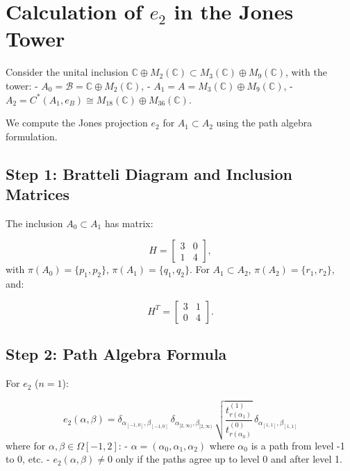 \documentclass[11pt]{article}
\theoremstyle{mytheoremstyle}
\theoremstyle{definition}
\theoremstyle{remark}
\begin{document}
\section*{Calculation of \( e_2 \) in the Jones Tower}

Consider the unital inclusion \( \mathbb{C} \oplus M_2(\mathbb{C}) \subset M_3(\mathbb{C}) \oplus M_9(\mathbb{C}) \), with the tower:
- \( A_0 = \mathcal{B} = \mathbb{C} \oplus M_2(\mathbb{C}) \),
- \( A_1 = A = M_3(\mathbb{C}) \oplus M_9(\mathbb{C}) \),
- \( A_2 = C^*(A_1, e_B) \cong M_{18}(\mathbb{C}) \oplus M_{36}(\mathbb{C}) \).

We compute the Jones projection \( e_2 \) for \( A_1 \subset A_2 \) using the path algebra formulation.
\medskip

\subsection*{Step 1: Bratteli Diagram and Inclusion Matrices}
The inclusion \( A_0 \subset A_1 \) has matrix:

\[
H = \begin{bmatrix} 3 & 0 \\
1 & 4 \end{bmatrix},
\]
with \( \pi(A_0) = \{ p_1, p_2 \} \), \( \pi(A_1) = \{ q_1, q_2 \} \). For \( A_1 \subset A_2 \), \( \pi(A_2) = \{ r_1, r_2 \} \), and:

\[
H^T = \begin{bmatrix} 3 & 1 \\
0 & 4 \end{bmatrix}.
\]
\medskip

\subsection*{Step 2: Path Algebra Formula}
For \( e_2 \) (\( n=1 \)):

\[
e_{2}(\alpha, \beta) = \delta_{\alpha_{[-1,0]}, \beta_{[-1,0]}} \, \delta_{\alpha_{[2, \infty)}, \beta_{[2, \infty)}} \, \sqrt{ \frac{t^{(1)}_{r(\alpha_1)}}{t^{(0)}_{r(\alpha_0)}} } \, \delta_{\alpha_{[1,1]}, \beta_{[1,1]}}
\]
where for \( \alpha, \beta \in \Omega[-1,2] \):
- \( \alpha = (\alpha_0, \alpha_1, \alpha_2) \) where \( \alpha_0 \) is a path from level -1 to 0, etc.
- \( e_2(\alpha, \beta) \neq 0 \) only if the paths agree up to level 0 and after level 1.
\medskip
\end{document}
